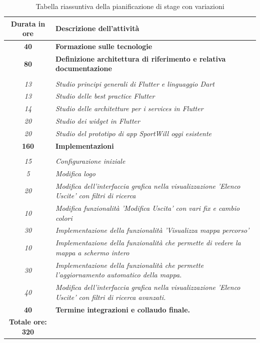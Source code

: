 \begin{center}
	\begin{table}[h!]
		
		\label{tab:Tabella riassuntiva della pianificazione di stage con variazioni}
		\begin{tabularx}{\textwidth}{|c|X|}
			
			\hline
			\textbf{Durata in ore} & \textbf{Descrizione dell'attività} \\\hline
			
			\textbf{40} & \textbf{Formazione sulle tecnologie} \\	 
			\hline
			
			\textbf{80} & \textbf{Definizione architettura di riferimento e relativa documentazione} \\  \hdashline
			\multirow{3}{0cm}\\ 
			\textit{13} & 
			\textit{Studio principi generali di Flutter e linguaggio Dart} \\
			\textit{13} & 
			\textit{Studio delle best practice Flutter} \\
			\textit{14} & 
			\textit{Studio delle architetture per i services in Flutter} \\
			\textit{20} & 
			\textit{Studio dei widget in Flutter} \\
			\textit{20} & 
			\textit{Studio del prototipo di app SportWill oggi esistente} \\
			\hline
			\textbf{160} & \textbf{Implementazioni} \\ \hdashline
			\multirow{3}{0cm}\\
			\textit{15} & 
			\textit{Configurazione iniziale} \\ 
			\textit{5} & 
			\textit{Modifica logo} \\ 
			\textit{20} & 
			\textit{Modifica dell’interfaccia grafica nella visualizzazione ’Elenco Uscite’ con filtri di ricerca} \\
			\textit{10} & 
			\textit{Modifica funzionalità 'Modifica Uscita' con vari fix e cambio colori} \\
			\textit{30} & 
			\textit{Implementazione della funzionalità 'Visualizza mappa percorso'} \\
			\textit{10} & 
			\textit{Implementazione della funzionalità che permette di vedere la mappa a schermo intero} \\
			\textit{30} & 
			\textit{Implementazione della funzionalità che permette l'aggiornamento automatico della mappa.} \\
			\textit{40} & 
			\textit{Modifica dell'interfaccia grafica nella visualizzazione 'Elenco Uscite' con filtri di ricerca avanzati.} \\
			\hline
			\textbf{40} & \textbf{Termine integrazioni e collaudo finale.}  \\ 
			\hline
			\hline
			\textbf{Totale ore: 320} &  \\\hline	
		\end{tabularx}
		\vspace{0.3cm}
		\caption{Tabella riassuntiva della pianificazione di stage con variazioni}
	\end{table}
\end{center}
\newpage
